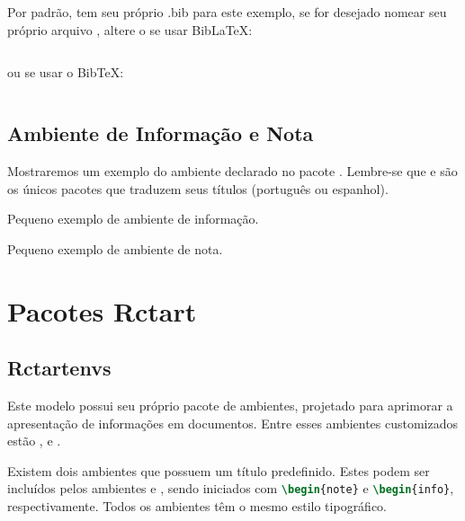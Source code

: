         Por padrão,  tem seu próprio .bib para este exemplo, se for desejado nomear seu próprio arquivo , altere o  se usar Bib\LaTeX:		
\nolinenumbers
\begin{lstlisting}[language=TeX]

\end{lstlisting}
\linenumbers
ou se usar o Bib\TeX:
\nolinenumbers
\begin{lstlisting}[language=TeX]

\end{lstlisting}
\linenumbers

  \subsection{Ambiente de Informação e Nota}

        Mostraremos um exemplo do ambiente  declarado no pacote . Lembre-se que  e  são os únicos pacotes que traduzem seus títulos (português ou espanhol).

        \begin{info}
            Pequeno exemplo de ambiente de informação.
        \end{info}
        \begin{note}
            Pequeno exemplo de ambiente de nota.
        \end{note}
        
        
        

    \section{Pacotes Rctart}

    \subsection{Rctartenvs}
    
        Este modelo possui seu próprio pacote  de ambientes, projetado para aprimorar a apresentação de informações em documentos. Entre esses ambientes customizados estão ,  e .
    
        Existem dois ambientes que possuem um título predefinido. Estes podem ser incluídos pelos ambientes  e , sendo iniciados com \lstinline[language=TeX]|\begin{note}| e \lstinline[language=TeX]|\begin{info}|, respectivamente. Todos os ambientes têm o mesmo estilo tipográfico.
    	
